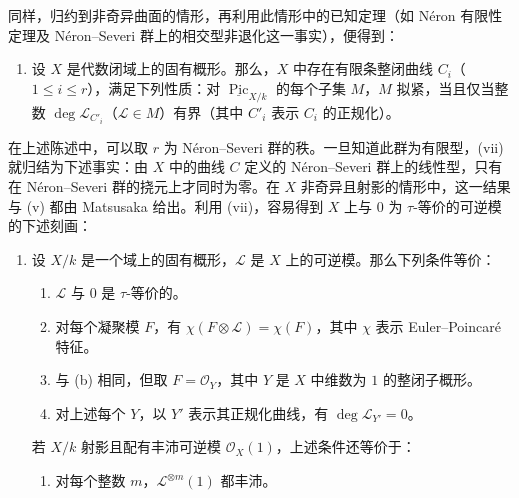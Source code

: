 \begin{remark}{}
\begin{enumerate}
    \end{enumerate}\par{}同样，归约到非奇异曲面的情形，再利用此情形中的已知定理（如 Néron 有限性定理及 Néron–Severi 群上的相交型非退化这一事实），便得到：\begin{enumerate}
      
 \item[vii.]设 \(X\) 是代数闭域上的固有概形。那么，\(X\) 中存在有限条整闭曲线 \(C_i\)（\(1\leqslant  i\leqslant  r\)），满足下列性质：对 \(\underline {\operatorname {Pic}}_{X/k}\) 的每个子集 \(M\)，\(M\) 拟紧，当且仅当整数 \(\deg \mathscr {L}_{C'_i}\)（\(\mathscr {L}\in  M\)）有界（其中 \(C'_i\) 表示 \(C_i\) 的正规化）。

    \end{enumerate}在上述陈述中，可以取 \(r\) 为 Néron–Severi 群的秩。一旦知道此群为有限型，(vii) 就归结为下述事实：由 \(X\) 中的曲线 \(C\) 定义的 Néron–Severi 群上的线性型，只有在 Néron–Severi 群的挠元上才同时为零。在 \(X\) 非奇异且射影的情形中，这一结果与 (v) 都由 Matsusaka 给出。利用 (vii)，容易得到 \(X\) 上与 \(0\) 为 \(\tau \)-等价的可逆模的下述刻画：\begin{enumerate}
      
 \item[viii.]
        \par{}设 \(X/k\) 是一个域上的固有概形，\(\mathscr {L}\) 是 \(X\) 上的可逆模。那么下列条件等价：\begin{enumerate}
            
 \item[a.]\(\mathscr {L}\) 与 \(0\) 是 \(\tau \)-等价的。

            
 \item[b.]对每个凝聚模 \(F\)，有 \(\chi (F\otimes \mathscr {L})=\chi (F)\)，其中 \(\chi \) 表示 Euler–Poincaré 特征。

            
 \item[b'.]与 (b) 相同，但取 \(F=\mathcal {O}_Y\)，其中 \(Y\) 是 \(X\) 中维数为 \(1\) 的整闭子概形。

            
 \item[c.]对上述每个 \(Y\)，以 \(Y'\) 表示其正规化曲线，有 \(\deg \mathscr {L}_{Y'}=0\)。

          \end{enumerate}若 \(X/k\) 射影且配有丰沛可逆模 \(\mathcal {O}_X(1)\)，上述条件还等价于：\begin{enumerate}
            
 \item[d.]对每个整数 \(m\)，\(\mathscr {L}^{\otimes  m}(1)\) 都丰沛。


\end{enumerate}
\end{enumerate}
\end{remark}
